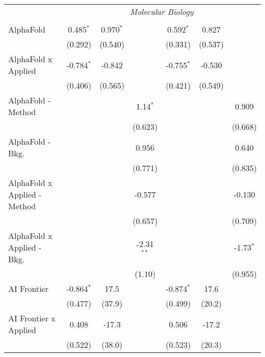 \begin{tabular}{lcccccc}
 & \multicolumn{6}{c}{\textit{Molecular Biology}} \\ \\
   AlphaFold                      & 0.485$^{*}$  & 0.970$^{*}$ &              & 0.592$^{*}$  & 0.827   &   \\   
                                  & (0.292)      & (0.540)     &              & (0.331)      & (0.537) &   \\   
   AlphaFold x Applied            & -0.784$^{*}$ & -0.842      &              & -0.755$^{*}$ & -0.530  &   \\   
                                  & (0.406)      & (0.565)     &              & (0.421)      & (0.549) &   \\   
   AlphaFold - Method             &              &             & 1.14$^{*}$   &              &         & 0.909\\   
                                  &              &             & (0.623)      &              &         & (0.668)\\   
   AlphaFold - Bkg.               &              &             & 0.956        &              &         & 0.640\\   
                                  &              &             & (0.771)      &              &         & (0.835)\\   
   AlphaFold x Applied - Method   &              &             & -0.577       &              &         & -0.130\\   
                                  &              &             & (0.657)      &              &         & (0.709)\\   
   AlphaFold x Applied - Bkg.     &              &             & -2.31$^{**}$ &              &         & -1.73$^{*}$\\   
                                  &              &             & (1.10)       &              &         & (0.955)\\   
   AI Frontier                    & -0.864$^{*}$ & 17.5        &              & -0.874$^{*}$ & 17.6    &   \\   
                                  & (0.477)      & (37.9)      &              & (0.499)      & (20.2)  &   \\   
   AI Frontier x Applied          & 0.408        & -17.3       &              & 0.506        & -17.2   &   \\   
                                  & (0.522)      & (38.0)      &              & (0.523)      & (20.3)  &   \\   

\end{tabular}
